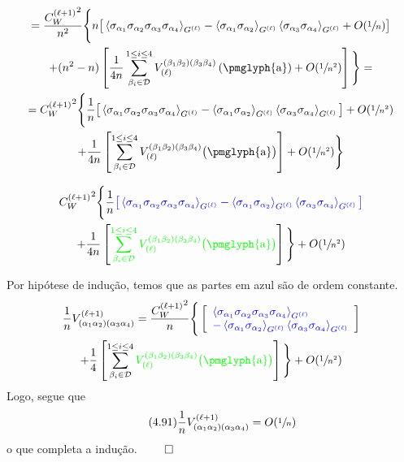 \documentclass{beamer}
\newcommand{\Dcal}{\mathcal{D}}
\def\mi#1{{\alpha_{#1}}}
\def\mj#1{\beta_{#1}}
\def\eell{{(\ell)}}
\def\eellum{{(\ell+1)}}
\newcommand{\Vertice}[5]{V^{(#1)}_{(\mi#2\mi#3)(\mi#4\mi#5)}}
\newcommand{\Verticeinvb}[5]{V_{(#1)}^{(\mj#2\mj#3)(\mj#4\mj#5)}}
\newcommand{\Expectation}[2]{\left\langle #1 \right\rangle_{#2}}
\begin{document}
\begin{frame} 
	\small
	\begin{multline*}
		= \frac{{C_W^\eellum}^2}{n^2} \Bigg\{n\big[\Expectation{\sigma_\mi1\sigma_\mi2\sigma_\mi3\sigma_\mi4}{G^\eell} - \Expectation{\sigma_\mi1\sigma_\mi2}{G^\eell}  \Expectation{\sigma_\mi3\sigma_\mi4}{G^\eell}  +  O(\sfrac{1}{n}) \big] \\ 
		+(n^2-n)\left[\frac{1}{4n}\sum_{\mj{i}\in\Dcal}^{1\le{i}\le4}\Verticeinvb{\ell}1234\left(\text{\pmglyph{a}}\right) + O(\sfrac{1}{n^2})\right]\Bigg\} =\\
		= {{C_W^\eellum}^2} \Bigg\{ \frac{1}{n}\big[\Expectation{\sigma_\mi1\sigma_\mi2\sigma_\mi3\sigma_\mi4}{G^\eell} - \Expectation{\sigma_\mi1\sigma_\mi2}{G^\eell}  \Expectation{\sigma_\mi3\sigma_\mi4}{G^\eell} \big]  +  O(\sfrac{1}{n^2})\\
		+ \frac{1}{4n}\left[\sum_{\mj{i}\in\Dcal}^{1\le{i}\le4}\Verticeinvb{\ell}1234\big(\text{\pmglyph{a}}\big)\right] + O(\sfrac{1}{n^2})\Bigg\}
	\end{multline*}
	
\end{frame}

\begin{frame}
	\small
	\begin{multline*}
		 {{C_W^\eellum}^2} \Bigg\{ \frac{1}{n} {\color{blue}
		 \big[\Expectation{\sigma_\mi1\sigma_\mi2\sigma_\mi3\sigma_\mi4}{G^\eell} - \Expectation{\sigma_\mi1\sigma_\mi2}{G^\eell}  \Expectation{\sigma_\mi3\sigma_\mi4}{G^\eell} \big] }  \\
		+ \frac{1}{4n}\left[ {\color{green}\sum_{\mj{i}\in\Dcal}^{1\le{i}\le4}\Verticeinvb{\ell}1234\big(\text{\pmglyph{a}}\big) }\right] \Bigg\} + O(\sfrac{1}{n^2})
	\end{multline*}
	
\end{frame}

\begin{frame}
	Por hipótese de indução, temos que as partes em azul são de ordem constante.
	{\small
	\begin{multline*}
		 \frac{1}{n}\Vertice{\ell+1}1234 = \frac{{C_W^\eellum}^2}{n} \Bigg\{  
		 \left[{\color{blue} \begin{array}{l}
		 \Expectation{\sigma_\mi1\sigma_\mi2\sigma_\mi3\sigma_\mi4}{G^\eell} \\
		 - \Expectation{\sigma_\mi1\sigma_\mi2}{G^\eell}  \Expectation{\sigma_\mi3\sigma_\mi4}{G^\eell} 
		 \end{array} }
\right]   \\
		+ \frac{1}{4}\left[ \sum_{\mj{i}\in\Dcal}^{1\le{i}\le4}{\color{green}\Verticeinvb{\ell}1234\big(\text{\pmglyph{a}}\big) }\right] \Bigg\} + O(\sfrac{1}{n^2})
	\end{multline*}
	}
	Logo, segue que 
	\begin{equation*}\tag{4.91}
		\frac{1}{n}\Vertice{\ell+1}1234 = O(\sfrac{1}{n}) 
	\end{equation*}
	o que completa a indução. \hfill $\qed$ 
\end{frame}
\end{document}
